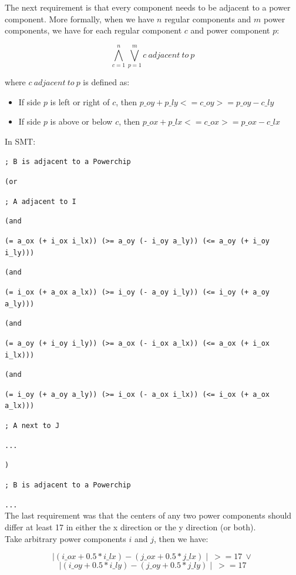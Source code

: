 \documentclass[a4paper]{article}
\begin{document}
	\noindent The next requirement is that every component needs to be adjacent to a power component. More formally, when we have $n$ regular components and $m$ power components, we have for each regular component $c$ and power component $p$:
	
	$$\bigwedge_{c=1}^n \bigvee_{p=1}^m c\ adjacent\ to\ p $$
	
	\noindent where $c\ adjacent\ to\ p $ is defined as:
	\begin{itemize}
	\item If side $p$ is left or right of $c$, then $p\_oy + p\_ly <= c\_oy >= p\_oy - c\_ly$
	\item If side $p$ is above or below $c$, then $p\_ox + p\_lx <= c\_ox >= p\_ox - c\_lx$
	\end{itemize}
	
	\noindent In SMT:
	
	{\tt ; B is adjacent to a Powerchip}
	
	{\tt (or}
	
	{\tt ; A adjacent to I}
	
	{\tt (and}
	
	{\tt (= a\_ox (+ i\_ox i\_lx)) (>= a\_oy (- i\_oy a\_ly)) (<= a\_oy (+ i\_oy i\_ly)))}
	
	{\tt (and}
	
	{\tt (= i\_ox (+ a\_ox a\_lx)) (>= i\_oy (- a\_oy i\_ly)) (<= i\_oy (+ a\_oy a\_ly)))}
	
	{\tt (and }
	
	{\tt (= a\_oy (+ i\_oy i\_ly)) (>= a\_ox (- i\_ox a\_lx)) (<= a\_ox (+ i\_ox i\_lx)))}
	
	{\tt (and}
	
	{\tt (= i\_oy (+ a\_oy a\_ly)) (>= i\_ox (- a\_ox i\_lx)) (<= i\_ox (+ a\_ox a\_lx)))}
	
	{\tt ; A next to J}
	
	{\tt ...}
	
	{\tt )}

	{\tt ; B is adjacent to a Powerchip}

	{\tt ...}\\
	
	\noindent The last requirement was that the centers of any two power components should differ at least 17 in either the x direction or the y direction (or both).\\
	Take arbitrary power components $i$ and $j$, then we have:
	
	$$\mid(i\_ox + 0.5 * i\_lx) - (j\_ox + 0.5 * j\_lx)\mid\ >= 17\ \vee$$
	$$\mid(i\_oy + 0.5 * i\_ly) - (j\_oy + 0.5 * j\_ly)\mid\ >= 17 $$
	
\end{document}
